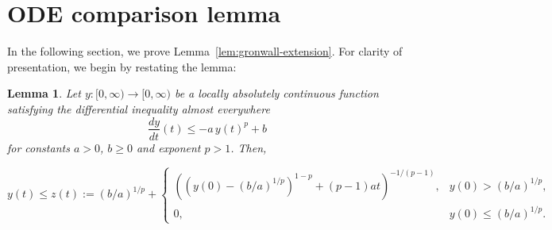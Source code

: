 \documentclass[11pt]{article}
\theoremstyle{myplain}
\newtheorem{lem}[lem]{Lemma}
\theoremstyle{mydefinition}
\theoremstyle{remark}
\DeclareMathOperator{\1}{\mathds{1}}
\begin{document}
\section{ODE comparison lemma}\label{appx:ode-comparison-lemma}
    In the following section, we prove Lemma~\ref{lem:gronwall-extension}. For clarity of presentation, we begin by restating the lemma:
    \begin{lem}\label{appx-lem:gronwall-extension}
        Let $y : [0, \infty) \to [0, \infty)$ be a locally absolutely continuous function satisfying the differential inequality almost everywhere
        \begin{equation*}
            \frac{dy}{dt}(t) \le -a\, y(t)^p + b
        \end{equation*}
        for constants $a>0$, $b\geq0$ and exponent $p > 1$. Then,
        
        \begin{equation*}
            y(t)\leq z(t):=(b/a)^{1/p}+
            \begin{cases}
                ((y(0)-(b/a)^{1/p})^{1-p}+(p-1)at)^{-1/(p-1)},&y(0)>(b/a)^{1/p},\\
                0,&y(0)\leq(b/a)^{1/p}.
            \end{cases}
        \end{equation*}
        

    \end{lem}
\end{document}
